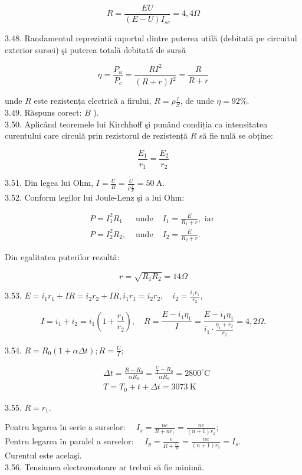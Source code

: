 \documentclass[10pt]{article}
\begin{document}
$$
R=\frac{E U}{(E-U) I_{s c}}=4,4 \Omega
$$

3.48. Randamentul reprezintă raportul dintre puterea utilă (debitată pe circuitul exterior sursei) şi puterea totală debitată de sursă

$$
\eta=\frac{P_{u}}{P_{c}}=\frac{R I^{2}}{(R+r) I^{2}}=\frac{R}{R+r}
$$

unde $R$ este rezistența electrică a firului, $R=\rho \frac{l}{S}$, de unde $\eta=92 \%$.\\
3.49. Răspuns corect: $B$ ).\\
3.50. Aplicând teoremele lui Kirchhoff şi punând condiția ca intensitatea curentului care circulă prin rezistorul de rezistență $R$ să fie nulă se obține:

$$
\frac{E_{1}}{r_{1}}=\frac{E_{2}}{r_{2}}
$$

3.51. Din legea lui Ohm, $I=\frac{U}{R}=\frac{U}{\rho \frac{l}{S}}=50 \mathrm{~A}$.\\
3.52. Conform legilor lui Joule-Lenz şi a lui Ohm:

$$
\begin{array}{lll}
P=I_{1}^{2} R_{1} & \text { unde } & I_{1}=\frac{E}{R_{1}+r}, \text { iar } \\
P=I_{2}^{2} R_{2}, & \text { unde } & I_{2}=\frac{E}{R_{2}+r} .
\end{array}
$$

Din egalitatea puterilor rezultă:

$$
r=\sqrt{R_{1} R_{2}}=14 \Omega
$$

3.53. $E=i_{1} r_{1}+I R=i_{2} r_{2}+I R, i_{1} r_{1}=i_{2} r_{2}, \quad i_{2}=\frac{i_{1} r_{1}}{r_{2}}$,

$$
I=i_{1}+i_{2}=i_{1}\left(1+\frac{r_{1}}{r_{2}}\right), \quad R=\frac{E-i_{1} \eta_{1}}{I}=\frac{E-i_{1} \eta_{1}}{i_{1} \cdot \frac{\eta_{1}+r_{2}}{r_{2}}}=4,2 \Omega .
$$

3.54. $R=R_{0}(1+\alpha \Delta t) ; R=\frac{U}{I}$;

$$
\begin{aligned}
& \Delta t=\frac{R-R_{0}}{\alpha R_{0}}=\frac{\frac{U}{I}-R_{0}}{\alpha R_{0}}=2800^{\circ} \mathrm{C} \\
& T=T_{0}+t+\Delta t=3073 \mathrm{~K}
\end{aligned}
$$

3.55. $R=r_{1}$.

Pentru legarea în serie a surselor: $\quad I_{s}=\frac{n e}{R+n r_{1}}=\frac{n e}{(n+1) r_{1}}$;\\
Pentru legarea în paralel a surselor: $\quad I_{p}=\frac{e}{R+\frac{r_{1}}{n}}=\frac{n e}{(n+1) r_{1}}=I_{s}$.\\
Curentul este acelaşi.\\
3.56. Tensiunea electromotoare ar trebui să fie minimă.
\end{document}
